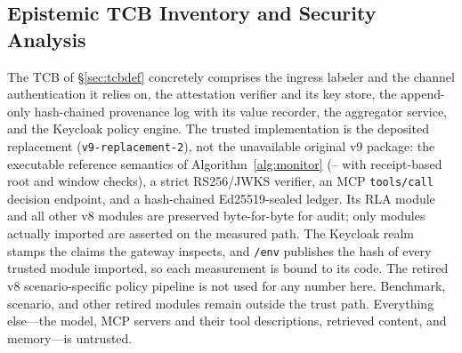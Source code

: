 \subsection{Epistemic TCB Inventory and Security Analysis}
\label{sec:tcb}
\label{sec:security}
The TCB of \S\ref{sec:tcbdef} concretely comprises the ingress labeler
and the channel authentication it relies on, the attestation verifier
and its key store, the append-only hash-chained provenance log with its
value recorder, the aggregator service, and the Keycloak policy engine.
The trusted implementation is the deposited replacement
(\texttt{v9-replacement-2}), not the unavailable original v9 package:
the executable reference semantics of Algorithm~\ref{alg:monitor}
(\Ione--\Ifour{} with receipt-based root and window checks), a strict
RS256/JWKS verifier, an MCP \texttt{tools/call} decision endpoint, and a
hash-chained Ed25519-sealed ledger. Its RLA module and all other v8
modules are preserved byte-for-byte for audit; only modules actually
imported are asserted on the measured path. The Keycloak realm stamps
the claims the gateway inspects, and \texttt{/env} publishes the hash of
every trusted module imported, so each measurement is bound to its code.
The retired v8 scenario-specific policy pipeline is not used for any
number here. Benchmark, scenario, and other retired modules remain
outside the trust path. Everything else---the model, MCP servers and
their tool descriptions, retrieved content, and memory---is untrusted.

